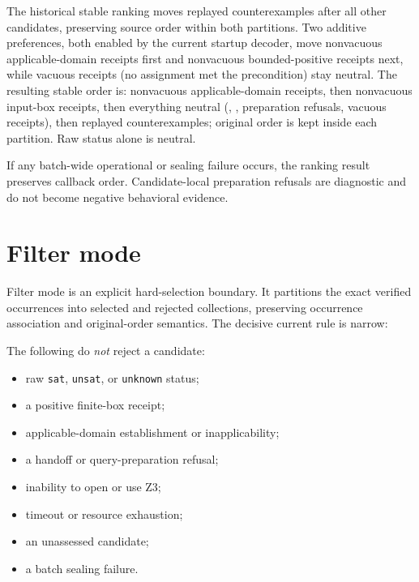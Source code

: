 \documentclass[10pt,letterpaper,oneside]{report}
\newcommand{\code}[1]{\texttt{\detokenize{#1}}}
\newcommand{\sat}{\texttt{sat}}
\newcommand{\unsat}{\texttt{unsat}}
\newcommand{\unknown}{\texttt{unknown}}
\begin{document}
The historical stable ranking moves replayed counterexamples after all other candidates, preserving source order within both partitions. Two additive preferences, both enabled by the current startup decoder, move nonvacuous applicable-domain receipts first and nonvacuous bounded-positive receipts next, while vacuous receipts (no assignment met the precondition) stay neutral. The resulting stable order is: nonvacuous applicable-domain receipts, then nonvacuous input-box receipts, then everything neutral (\code{Unassessed}, \code{Heuristic}, preparation refusals, vacuous receipts), then replayed counterexamples; original order is kept inside each partition. Raw status alone is neutral.

If any batch-wide operational or sealing failure occurs, the ranking result preserves callback order. Candidate-local preparation refusals are diagnostic and do not become negative behavioral evidence.

\section{Filter mode}

Filter mode is an explicit hard-selection boundary. It partitions the exact verified occurrences into selected and rejected collections, preserving occurrence association and original-order semantics. The decisive current rule is narrow:

\begin{center}
\end{center}

The following do \emph{not} reject a candidate:

\begin{itemize}
\item raw \sat, \unsat, or \unknown{} status;
\item a positive finite-box receipt;
\item applicable-domain establishment or inapplicability;
\item a handoff or query-preparation refusal;
\item inability to open or use Z3;
\item timeout or resource exhaustion;
\item an unassessed candidate;
\item a batch sealing failure.
\end{itemize}
\end{document}
